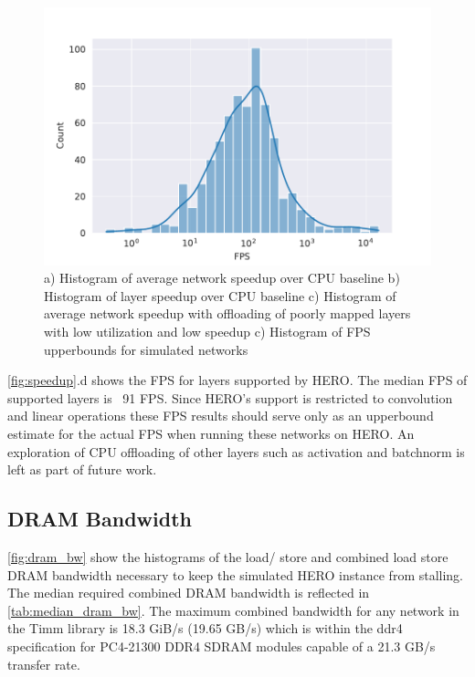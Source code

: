 \begin{figure}
    \hspace{0.1cm} 
    \includegraphics[scale=0.46]{Plots/latency/fps.pdf}
    \caption{a) Histogram of average network speedup over CPU baseline b) Histogram of layer speedup over CPU baseline c) Histogram of average network speedup with offloading of poorly mapped layers with low utilization and low speedup c) Histogram of FPS upperbounds for simulated networks}
    \label{fig:speedup}
\end{figure}

\autoref{fig:speedup}.d  shows the FPS for layers supported by HERO. The median FPS
of supported layers is ~91 FPS. Since HERO's support is restricted to
convolution and linear operations these FPS results should serve only as an
upperbound estimate for the actual FPS when running these networks on HERO. An
exploration of CPU offloading of other layers such as activation and batchnorm
is left as part of future work.  

\subsection{DRAM Bandwidth}
\label{chap:hero:results:bw}

\autoref{fig:dram_bw} show the histograms of the load/ store and combined
load store DRAM bandwidth necessary to keep the simulated HERO instance from
stalling. The median required combined DRAM bandwidth is reflected in
\autoref{tab:median_dram_bw}. The maximum combined bandwidth for any network in
the Timm library is 18.3 GiB/s (19.65 GB/s) which is within the ddr4 specification for
PC4-21300 DDR4 SDRAM modules \cite{wiki:List_of_interface_bit_rates} capable of
a 21.3 GB/s transfer rate. 

